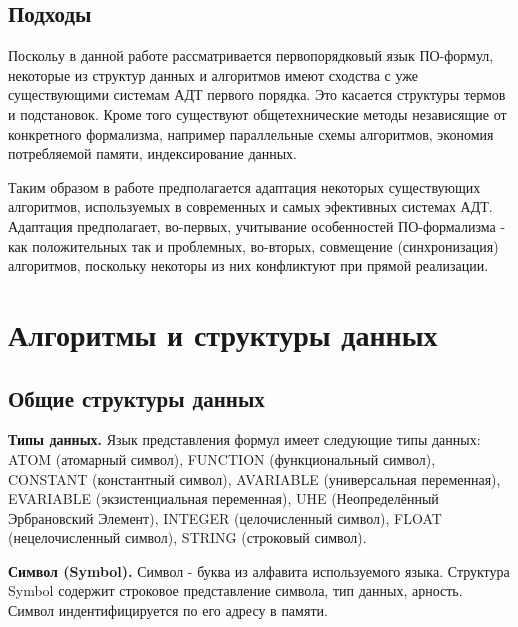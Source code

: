 \subsection{Подходы}
Поскольу в данной работе рассматривается первопорядковый язык ПО-формул, некоторые из структур данных и алгоритмов имеют сходства с уже существующими системам АДТ первого порядка. Это касается структуры термов и подстановок. Кроме того существуют общетехнические методы независящие от конкретного формализма, например параллельные схемы алгоритмов, экономия потребляемой памяти, индексирование данных.

Таким образом в работе предполагается адаптация некоторых существующих алгоритмов, используемых в современных и самых эфективных системах АДТ. Адаптация предполагает, во-первых, учитывание особенностей ПО-формализма - как положительных так и проблемных, во-вторых, совмещение (синхронизация) алгоритмов, поскольку некоторы из них конфликтуют при прямой реализации.



\section{Алгоритмы и структуры данных}

\subsection{Общие структуры данных}

\textbf{Типы данных.} Язык представления формул имеет следующие типы данных: ATOM (атомарный символ), FUNCTION (функциональный символ), CONSTANT (константный символ), AVARIABLE (универсальная переменная), EVARIABLE (экзистенциальная переменная), UHE (Неопределённый Эрбрановский Элемент), INTEGER (целочисленный символ), FLOAT (нецелочисленный символ), STRING (строковый символ).

\textbf{Символ (Symbol).} Символ - буква из алфавита используемого языка. Структура Symbol содержит строковое представление символа, тип данных, арность. Символ индентифицируется по его адресу в памяти.

